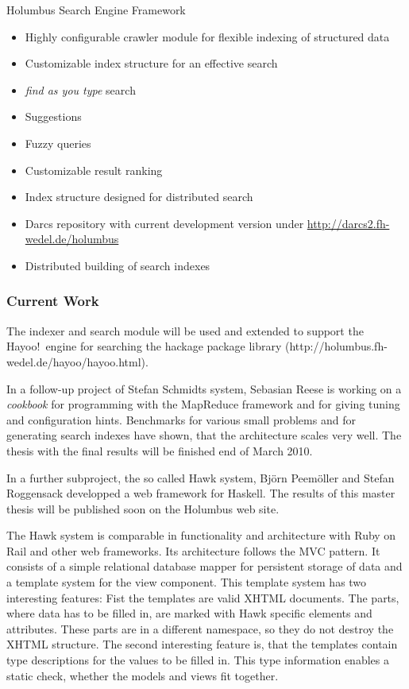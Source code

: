 \begin{hcarentry}[updated]{Holumbus Search Engine Framework}
\begin{itemize}
\item Highly configurable crawler module for flexible indexing of structured data
\item Customizable index structure for an effective search
\item {\em find as you type} search
\item Suggestions
\item Fuzzy queries
\item Customizable result ranking
\item Index structure designed for distributed search
\item Darcs repository with current development version under
  \url{http://darcs2.fh-wedel.de/holumbus}
\item Distributed building of search indexes
\end{itemize}

\subsubsection*{Current Work}

The indexer and search module will be used and extended
to support the Hayoo!\ engine for searching the hackage package library
(http://holumbus.fh-wedel.de/hayoo/hayoo.html).

In a follow-up project of Stefan Schmidts system,
Sebasian Reese is working on a {\em cookbook}
for programming with the MapReduce framework and for giving
tuning and configuration hints. Benchmarks for various small problems
and for generating search indexes have shown, that the architecture
scales very well. The thesis with the final results will be finished
end of March 2010. 

In a further subproject, the so called Hawk system, 
Bj\"orn Peem\"oller and Stefan Roggensack developped a web framework
for Haskell. The results of this master thesis will be published soon
on the Holumbus web site.

The Hawk system is comparable in functionality and architecture with Ruby on Rail
and other web frameworks. Its architecture follows the MVC pattern.
It consists of a simple relational database mapper for persistent storage of data
and a template system for the view component. This template system has two
interesting features: Fist the templates are valid XHTML documents. The parts,
where data has to be filled in, are marked with Hawk specific elements and attributes.
These parts are in a different namespace, so they do not destroy the XHTML structure.
The second interesting feature is, that the templates contain type descriptions for
the values to be filled in. This type information enables a static check, whether
the models and views fit together.


\end{hcarentry}
